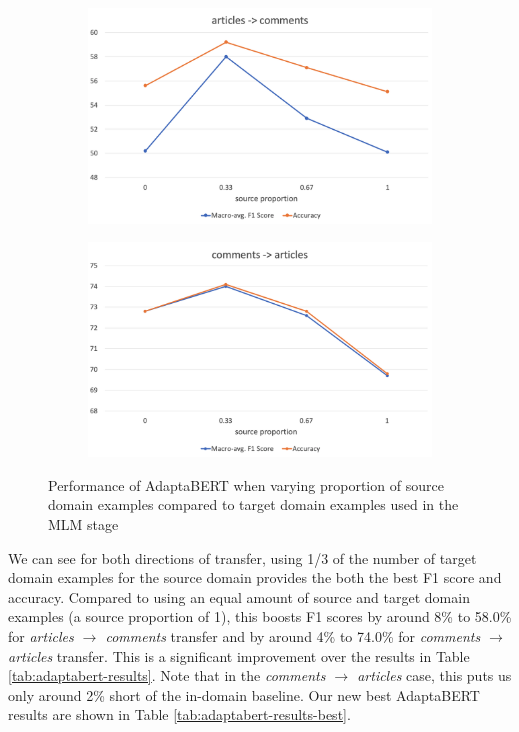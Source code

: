 \begin{figure}[ht]
    \centering
    \begin{subfigure}{\textwidth}
        \centering
        \includegraphics[scale=0.3]{0-img/src-proportion-articles-comments.png}
    \end{subfigure}
    \begin{subfigure}{\textwidth}
        \centering
        \includegraphics[scale=0.3]{0-img/src-proportion-comments-articles.png}
    \end{subfigure}
    \caption{Performance of AdaptaBERT when varying proportion of source domain examples compared to target domain examples used in the MLM stage}
    \label{fig:src-proportion}
\end{figure}

We can see for both directions of transfer, using 1/3 of the number of target domain examples for the source domain provides the both the best F1 score and accuracy. Compared to using an equal amount of source and target domain examples (a source proportion of 1), this boosts F1 scores by around 8\% to 58.0\% for \textit{articles $ \rightarrow $ comments} transfer and by around 4\% to 74.0\% for \textit{comments $ \rightarrow $ articles} transfer. This is a significant improvement over the results in Table \ref{tab:adaptabert-results}. Note that in the \textit{comments $ \rightarrow $ articles} case, this puts us only around 2\% short of the in-domain baseline. Our new best AdaptaBERT results are shown in Table \ref{tab:adaptabert-results-best}.

